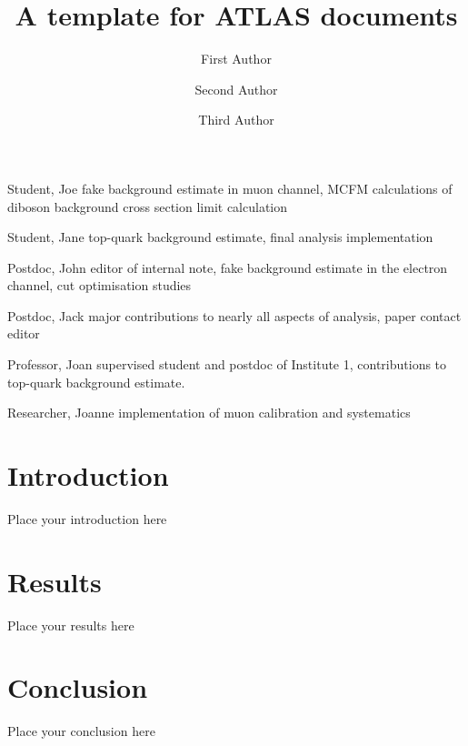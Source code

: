 \documentclass{atlasnote}
\title{A template for ATLAS documents}
\author[a]{First Author}
\author[a]{Second Author}
\author[b]{Third Author}
\affil[a]{One Institution}
\affil[b]{Another Institution}
\begin{document}

\begin{atlascontribute}
\item[Student, Joe] fake background estimate in muon channel, MCFM
  calculations of diboson background cross section limit calculation
\item[Student, Jane] top-quark background estimate, final
  analysis implementation
\item[Postdoc, John] editor of internal note, fake background
  estimate in the electron channel, cut optimisation studies
\item[Postdoc, Jack] major contributions to nearly all aspects of
  analysis, paper contact editor
\item[Professor, Joan] supervised student and postdoc of Institute 1,
  contributions to top-quark background estimate.
\item[Researcher, Joanne] implementation of muon calibration and systematics
\end{atlascontribute}
\clearpage

%

\section{Introduction}
\label{sec:intro}

Place your introduction here

\section{Results}
\label{sec:result}

Place your results here

\section{Conclusion}
\label{sec:conclusion}

Place your conclusion here
\end{document}
